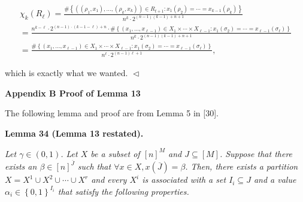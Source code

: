 \[\begin{gathered}
\displaystyle\chi_{k}(R_{\ell}) \displaystyle=\frac{\#\left\{((\rho_{1},x_{1}),\dots,(\rho_{k},x_{k}))\in R_{t+1}:x_{1}(\rho_{2})=\cdots=x_{k-1}(\rho_{k})\right\}}{n^{k}\cdot 2^{(n-1)(k-1)+n+1}} \\
\displaystyle=\frac{n^{k-\ell}\cdot 2^{(n-1)\cdot(k-1-\ell)+n}\cdot\#\left\{(x_{1},\dots,x_{\ell-1})\in X_{1}\times\cdots\times X_{\ell-1}:x_{1}(\sigma_{2})=\cdots=x_{\ell-1}(\sigma_{\ell})\right\}}{n^{k}\cdot 2^{(n-1)(k-1)+n+1}} \\
\displaystyle=\frac{\#\left\{(x_{1},\dots,x_{\ell-1})\in X_{1}\times\cdots\times X_{\ell-1}:x_{1}(\sigma_{2})=\cdots=x_{\ell-1}(\sigma_{\ell})\right\}}{n^{\ell}\cdot 2^{(n-1)\ell+1}},
\end{gathered}\]


which is exactly what we wanted.
$\vartriangleleft$\par






\par\medskip\noindent\textbf{
Appendix B Proof of Lemma 13
}\par




The following lemma and proof are from Lemma 5 in [30].\par





\par\medskip\noindent\textbf{
\textbf{Lemma 34}\textbf{ }(Lemma 13 restated)\textbf{.}
}\par



\emph{Let $\gamma\in(0,1)$.
Let $X$ be a subset of $[n]^{M}$ and $J\subseteq[M]$.
Suppose that there exists an $\beta\in[n]^{\overline{J}}$ such that $\forall x\in X,x(\overline{J})=\beta$.
Then, there exists a partition
$X=X^{1}\cup X^{2}\cup\cdots\cup X^{r}$
and every $X^{i}$ is associated with a set $I_{i}\subseteq J$ and a value $\alpha_{i}\in\left\{0,1\right\}^{I_{i}}$ that satisfy the following properties.}\par


